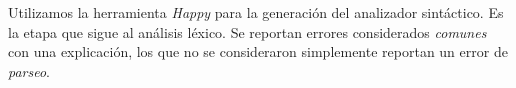 {\begin{implementationfr}
Utilizamos la herramienta \emph{Happy} \cite{happy} para la generación del analizador sintáctico. Es la etapa que sigue al análisis léxico. Se reportan errores considerados \emph{comunes} con una explicación, los que no se consideraron simplemente reportan un error de \emph{parseo}.

{   %
\renewcommand{\emph}[1]{\textbf{\textit{#1}}}
\renewcommand{\_}{\:\:}

\newcommand{\maybe}[1]{\left[ \_ #1 \_ \right]}
\newcommand{\listZ}[1]{#1^{*}}
\renewcommand{\list}[1]{#1^{+}}
\newcommand{\listSepZ}[2]{#1^{* [ \_ #2 \_ ]}}
\newcommand{\listSep}[2]{#1^{+ [ \_ #2 \_ ]}}

\newcommand{\lt}[1]{\textbf{\color{darkcandyapplered}\text{#1}}}

\newcommand{\scope}[1]{\widehat{\{} \_ #1 \_ \widehat{\}}}
\newcommand{\parens}[1]{\lt{(} \_ #1 \_ \lt{)}}
\newcommand{\scolon}{\widehat{;}}

}
\end{implementationfr}}
